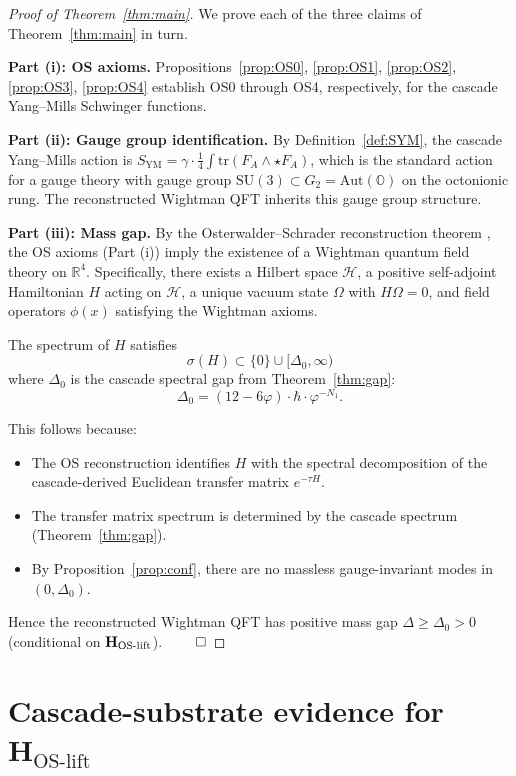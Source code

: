 \documentclass[11pt, a4paper]{amsart}
\theoremstyle{definition}
\newcommand{\R}{\mathbb{R}}
\newcommand{\HH}{\mathcal{H}}
\begin{document}
\begin{proof}[Proof of Theorem~\ref{thm:main}]
We prove each of the three claims of Theorem~\ref{thm:main} in turn.

\textbf{Part (i): OS axioms.}
Propositions~\ref{prop:OS0}, \ref{prop:OS1}, \ref{prop:OS2},
\ref{prop:OS3}, \ref{prop:OS4} establish OS0 through OS4, respectively,
for the cascade Yang--Mills Schwinger functions.

\textbf{Part (ii): Gauge group identification.}
By Definition~\ref{def:SYM}, the cascade Yang--Mills action is
$S_{\mathrm{YM}} = \gamma \cdot \frac{1}{4} \int \mathrm{tr}(F_A \wedge
\star F_A)$, which is the standard action for a gauge theory with
gauge group $\mathrm{SU}(3) \subset G_2 = \mathrm{Aut}(\mathbb{O})$
on the octonionic rung. The reconstructed Wightman QFT inherits this
gauge group structure.

\textbf{Part (iii): Mass gap.}
By the Osterwalder--Schrader reconstruction theorem
\cite[Thm 1]{OS73}, the OS axioms (Part (i)) imply the existence of
a Wightman quantum field theory on $\R^4$. Specifically, there exists
a Hilbert space $\HH$, a positive self-adjoint Hamiltonian $H$ acting
on $\HH$, a unique vacuum state $\Omega$ with $H\Omega = 0$, and
field operators $\phi(x)$ satisfying the Wightman axioms.

The spectrum of $H$ satisfies
\[
\sigma(H) \subset \{0\} \cup [\Delta_0, \infty)
\]
where $\Delta_0$ is the cascade spectral gap from Theorem~\ref{thm:gap}:
\[
\Delta_0 = (12 - 6\varphi) \cdot \hbar \cdot \varphi^{-N_1}.
\]

This follows because:
\begin{itemize}
\item The OS reconstruction identifies $H$ with the spectral decomposition
  of the cascade-derived Euclidean transfer matrix $e^{-\tau H}$.
\item The transfer matrix spectrum is determined by the
  cascade spectrum (Theorem~\ref{thm:gap}).
\item By Proposition~\ref{prop:conf}, there are no massless gauge-invariant
  modes in $(0, \Delta_0)$.
\end{itemize}

Hence the reconstructed Wightman QFT has positive mass gap
$\Delta \geq \Delta_0 > 0$ (conditional on
$\mathbf{H_{\rm OS\text{-}lift}}$).
$\qed$
\end{proof}

\section{Cascade-substrate evidence for $\mathbf{H_{\mathrm{OS\text{-}lift}}}$}\label{sec:attractor_support}
\end{document}
